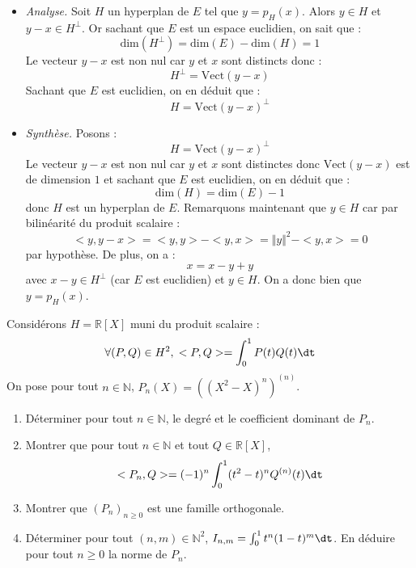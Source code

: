 \documentclass[a4paper,10pt]{report}
\begin{document}
 \begin{itemize}
 \item \textit{Analyse.} Soit $H$ un hyperplan de $E$ tel que $y = p_{H}(x)$. Alors $y \in H$ et $y-x \in H^{\perp}$. Or sachant que $E$ est un espace euclidien, on sait que :
 $$ \textrm{dim}(H^{\perp})= \textrm{dim}(E) - \textrm{dim}(H)=1$$
 Le vecteur $y-x$ est non nul car $y$ et $x$ sont distincts donc :
 $$ H^{\perp}= \textrm{Vect}(y-x)$$
 Sachant que $E$ est euclidien, on en déduit que :
 $$ H = \textrm{Vect}(y-x)^{\perp}$$
 \item \textit{Synthèse.} Posons :
 $$ H = \textrm{Vect}(y-x)^{\perp}$$
 Le vecteur $y-x$ est non nul car $y$ et $x$ sont distinctes donc $ \textrm{Vect}(y-x)$ est de dimension $1$ et sachant que $E$ est euclidien, on en déduit que :
 $$ \textrm{dim}(H) = \textrm{dim}(E) - 1 $$
 donc $H$ est un hyperplan de $E$. Remarquons maintenant que $y \in H$ car par bilinéarité du produit scalaire :
 $$ <y,y-x> = <y,y>-<y,x>= \Vert y \Vert^2 - <y,x>= 0$$
 par hypothèse. De plus, on a :
 $$ x=x-y+y$$
 avec $x-y \in H^{\perp}$ (car $E$ est euclidien) et $y \in H$. On a donc bien que $y = p_H(x)$.
\end{itemize}

\begin{Exercice}{} Considérons $H= \mathbb{R}[X]$ muni du produit scalaire :
$$ \forall (P,Q) \in H^2, \; <P,Q> = \int_{0}^1 P(t) Q(t) \dt $$
On pose pour tout $n \in \mathbb{N}$, $P_n(X)= ((X^2-X)^n)^{(n)}$.

\begin{enumerate}
\item Déterminer pour tout $n \in \mathbb{N}$, le degré et le coefficient dominant de $P_n$.
\item Montrer que pour tout $n \in \mathbb{N}$ et tout $Q \in \mathbb{R}[X]$,
$$ <P_n,Q> = (-1)^n \int_{0}^1 (t^2-t)^n Q^{(n)}(t) \dt $$
\item Montrer que $(P_n)_{n \geq 0}$ est une famille orthogonale.
\item Déterminer pour tout $(n,m) \in \mathbb{N}^2$, $I_{n,m} = \int_{0}^1 t^n(1-t)^m \dt$. En déduire pour tout $n \geq 0$ la norme de $P_n$.
\end{enumerate}
\end{Exercice}

\corr 
\end{document}
